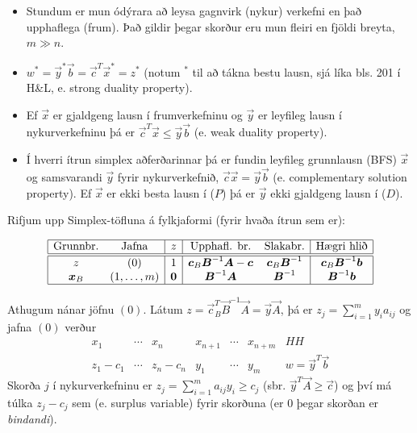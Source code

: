 \begin{aths}
\begin{itemize}
\item Stundum er mun ódýrara að leysa gagnvirk (nykur) verkefni en það upphaflega (frum). Það gildir þegar skorður eru mun fleiri en fjöldi breyta, $m \gg n$.
\item $w^* = \vec{y}^*\vec{b}  = \vec{c}^T \vec{x}^* = z^*$ (notum $^*$ til að tákna bestu lausn, sjá líka bls. 201 í H\&L, e. strong duality property).
\item Ef $\vec{x}$ er gjaldgeng lausn í frumverkefninu og $\vec{y}$ er leyfileg lausn í nykur\-verkefninu þá er $\vec{c}^T\vec{x}\le \vec{y}\vec{b}$ (e. weak duality property).
\item Í hverri ítrun simplex aðferðarinnar þá er fundin leyfileg grunnlausn (BFS) $\vec{x}$ og samsvarandi $\vec{y}$ fyrir nykurverkefnið, $\vec{c}\vec{x}=\vec{y}\vec{b}$ (e. complementary solution property). Ef $\vec{x}$ er ekki besta lausn í ($P$) þá er $\vec{y}$ ekki gjaldgeng lausn í ($D$).
\end{itemize}
\end{aths}


Rifjum upp Simplex-töfluna á fylkjaformi (fyrir hvaða ítrun sem er):
\begin{center}
{\renewcommand{\arraystretch}{1.5} \renewcommand{\tabcolsep}{0.2cm}{\footnotesize
\[ \begin{array}{|cc|c|cc|c|}\hline 
  \textrm{Grunnbr.} & \textrm{Jafna} & z & \textrm{Upphafl. br.} & \textrm{Slakabr.} & \textrm{Hægri hlið} \\ \hline\hline
  z & (0) & 1 & \vec{c}_B\vec{B}^{-1}\vec{A}-\vec{c} & \vec{c}_B\vec{B}^{-1} & \vec{c}_B\vec{B}^{-1}\vec{b} \\
\vec{x}_B & (1,\ldots,m) & \vec{0} & \vec{B}^{-1}\vec{A} & \vec{B}^{-1} & \vec{B}^{-1}\vec{b} \\ \hline
 \end{array}\]}}\end{center}
Athugum nánar jöfnu $(0)$. Látum $z=\vec{c}_B^T\vec{B}^{-1}\vec{A}=\vec{y}\vec{A}$, þá er $z_j=\sum_{i=1}^m y_i a_{ij}$ og jafna $(0)$ verður
\[ \begin{array}{cccccc|c}
 x_1 & \cdots & x_n & x_{n+1} & \cdots & x_{n+m} & HH \\
 z_1-c_1 & \cdots & z_n-c_n & y_1 & \cdots & y_m & w=\vec{y}^T\vec{b}    
\end{array}\]
Skorða $j$ í nykurverkefninu er $z_j=\sum_{i=1}^m a_{ij}y_i\geq c_j$ (sbr. $\vec{y}^T\vec{A}\geq\vec{c}$) og því má túlka $z_j-c_j$ sem  (e. surplus variable) fyrir skorðuna (er 0 þegar skorðan er \emph{bindandi}).

